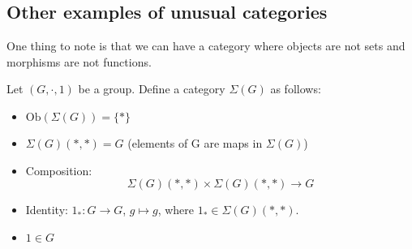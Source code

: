 \documentclass{article}
\begin{document}
    \subsection{Other examples of unusual categories}

    One thing to note is that we can have a category where objects are not sets and morphisms are not functions.

    Let $(G, \cdot , 1)$ be a group. Define a category $\Sigma(G)$ as follows:

    \begin{itemize}
        \item $\text{Ob}(\Sigma(G)) = \{ *\}$
        \item $\Sigma(G)(*, *) = G$ (elements of G are maps in $\Sigma(G)$)
        \item Composition:
        \[
            \Sigma(G)(*, *) \times \Sigma(G)(*, *) \to G
        \]
        \item Identity: $1_*: G \to G$, $g \mapsto g$, where $1_* \in \Sigma(G)(*, *)$.
        \item $1 \in G$

    \end{itemize}
\end{document}
